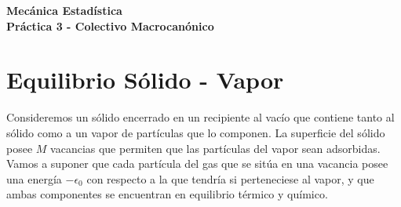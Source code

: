 \documentclass[a4paper,11pt]{article}
\begin{document}
\pagestyle{fancy}
\chead{\small \the\year}



\thispagestyle{plain}
\begin{center}
    \textbf{\large
        Mecánica Estadística \\
        Práctica 3 - Colectivo Macrocanónico
    }
\end{center}
\vspace{-1.5em}




\section{Equilibrio Sólido - Vapor}

Consideremos un sólido encerrado en un recipiente al vacío que 
contiene tanto al sólido como a un vapor de partículas que lo componen.
La superficie del sólido posee $M$ vacancias que permiten que las 
partículas del vapor sean adsorbidas. Vamos a suponer que cada 
partícula del gas que se sitúa en una vacancia posee una energía 
$-\epsilon_0$ con respecto a la que tendría si perteneciese al vapor, 
y que ambas componentes se encuentran en equilibrio 
térmico y químico.
\end{document}
